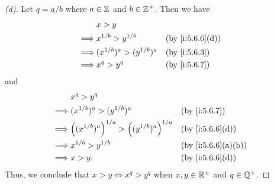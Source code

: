 \begin{proof}[(d)]
  Let \(q = a / b\) where \(a \in \mathbb{Z}\) and \(b \in \mathbb{Z}^+\).
  Then we have
  \begin{align*}
             & x > y                                              \\
    \implies & x^{1 / b} > y^{1 / b}         &  & \by{i:5.6.6}[d] \\
    \implies & (x^{1 / b})^a > (y^{1 / b})^a &  & \by{i:5.6.3}    \\
    \implies & x^q > y^q                     &  & \by{i:5.6.7}
  \end{align*}
  and
  \begin{align*}
             & x^q > y^q                                                                      \\
    \implies & (x^{1 / b})^a > (y^{1 / b})^a                           &  & \by{i:5.6.7}      \\
    \implies & \pa{(x^{1 / b})^a}^{1 / a} > \pa{(y^{1 / b})^a}^{1 / a} &  & \by{i:5.6.6}[d]   \\
    \implies & x^{1 / b} > y^{1 / b}                                   &  & \by{i:5.6.6}[a,b] \\
    \implies & x > y.                                                  &  & \by{i:5.6.6}[d]
  \end{align*}
  Thus, we conclude that \(x > y \iff x^q > y^q\) when \(x, y \in \mathbb{R}^+\) and \(q \in \mathbb{Q}^+\).
\end{proof}

